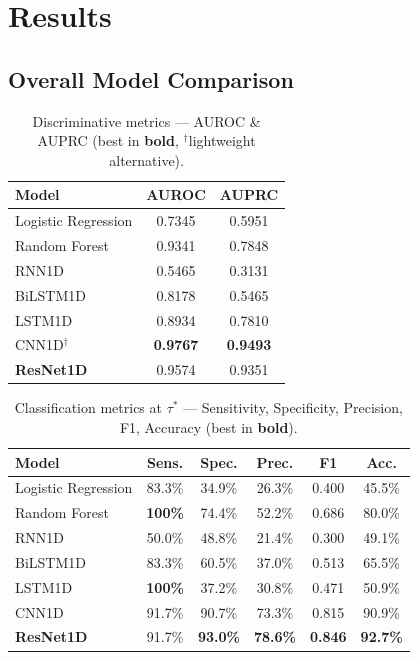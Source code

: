 \documentclass[journal, 10pt, twoside]{IEEEtran}
\begin{document}
\section{Results}
\label{sec:results}

\subsection{Overall Model Comparison}

\begin{table}[H]
  \centering
  \caption{Discriminative metrics — AUROC \& AUPRC (best in \textbf{bold},
           $^\dagger$lightweight alternative).}
  \label{tab:results_a}
  \renewcommand{\arraystretch}{1.15}
  \begin{tabular}{lcc}
    \toprule
    \textbf{Model} & \textbf{AUROC} & \textbf{AUPRC} \\
    \midrule
    Logistic Regression & 0.7345 & 0.5951 \\
    Random Forest       & 0.9341 & 0.7848 \\
    \midrule
    RNN1D               & 0.5465 & 0.3131 \\
    BiLSTM1D            & 0.8178 & 0.5465 \\
    LSTM1D              & 0.8934 & 0.7810 \\
    CNN1D$^\dagger$     & \textbf{0.9767} & \textbf{0.9493} \\
    \textbf{ResNet1D}   & 0.9574 & 0.9351 \\
    \bottomrule
  \end{tabular}
\end{table}

\begin{table}[H]
  \centering
  \caption{Classification metrics at $\tau^*$ — Sensitivity, Specificity,
           Precision, F1, Accuracy (best in \textbf{bold}).}
  \label{tab:results_b}
  \renewcommand{\arraystretch}{1.15}
  \begin{tabular}{lccccc}
    \toprule
    \textbf{Model} & \textbf{Sens.} & \textbf{Spec.} &
    \textbf{Prec.} & \textbf{F1} & \textbf{Acc.} \\
    \midrule
    Logistic Regression & 83.3\% & 34.9\% & 26.3\% & 0.400 & 45.5\% \\
    Random Forest & \textbf{100\%} & 74.4\% & 52.2\% & 0.686 & 80.0\% \\
    \midrule
    RNN1D    & 50.0\% & 48.8\% & 21.4\% & 0.300 & 49.1\% \\
    BiLSTM1D & 83.3\% & 60.5\% & 37.0\% & 0.513 & 65.5\% \\
    LSTM1D   & \textbf{100\%} & 37.2\% & 30.8\% & 0.471 & 50.9\% \\
    CNN1D    & 91.7\% & 90.7\% & 73.3\% & 0.815 & 90.9\% \\
    \textbf{ResNet1D} & 91.7\% & \textbf{93.0\%} & \textbf{78.6\%}
                      & \textbf{0.846} & \textbf{92.7\%} \\
    \bottomrule
  \end{tabular}
\end{table}
\end{document}
